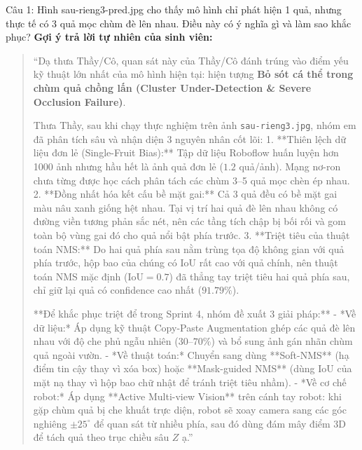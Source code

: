 \documentclass[11pt,a4paper]{article}
\begin{document}
\begin{ansbox}{Câu 1: Hình sau-rieng3-pred.jpg cho thấy mô hình chỉ phát hiện 1 quả, nhưng thực tế có 3 quả mọc chùm đè lên nhau. Điều này có ý nghĩa gì và làm sao khắc phục?}
\textbf{Gợi ý trả lời tự nhiên của sinh viên:}
\begin{quote}
``Dạ thưa Thầy/Cô, quan sát này của Thầy/Cô đánh trúng vào điểm yếu kỹ thuật lớn nhất của mô hình hiện tại: hiện tượng \textbf{Bỏ sót cá thể trong chùm quả chồng lấn (Cluster Under-Detection \& Severe Occlusion Failure)}.

Thưa Thầy, sau khi chạy thực nghiệm trên ảnh \texttt{sau-rieng3.jpg}, nhóm em đã phân tích sâu và nhận diện 3 nguyên nhân cốt lõi:
1. **Thiên lệch dữ liệu đơn lẻ (Single-Fruit Bias):** Tập dữ liệu Roboflow huấn luyện hơn 1000 ảnh nhưng hầu hết là ảnh quả đơn lẻ ($1.2$ quả/ảnh). Mạng nơ-ron chưa từng được học cách phân tách các chùm 3--5 quả mọc chèn ép nhau.
2. **Đồng nhất hóa kết cấu bề mặt gai:** Cả 3 quả đều có bề mặt gai màu nâu xanh giống hệt nhau. Tại vị trí hai quả đè lên nhau không có đường viền tương phản sắc nét, nên các tầng tích chập bị bối rối và gom toàn bộ vùng gai đó cho quả nổi bật phía trước.
3. **Triệt tiêu của thuật toán NMS:** Do hai quả phía sau nằm trùng tọa độ không gian với quả phía trước, hộp bao của chúng có IoU rất cao với quả chính, nên thuật toán NMS mặc định ($\text{IoU}=0.7$) đã thẳng tay triệt tiêu hai quả phía sau, chỉ giữ lại quả có confidence cao nhất ($91.79\%$).

**Để khắc phục triệt để trong Sprint 4, nhóm đề xuất 3 giải pháp:**
- *Về dữ liệu:* Áp dụng kỹ thuật Copy-Paste Augmentation ghép các quả đè lên nhau với độ che phủ ngẫu nhiên ($30\text{--}70\%$) và bổ sung ảnh gán nhãn chùm quả ngoài vườn.
- *Về thuật toán:* Chuyển sang dùng **Soft-NMS** (hạ điểm tin cậy thay vì xóa box) hoặc **Mask-guided NMS** (dùng IoU của mặt nạ thay vì hộp bao chữ nhật để tránh triệt tiêu nhầm).
- *Về cơ chế robot:* Áp dụng **Active Multi-view Vision** trên cánh tay robot: khi gặp chùm quả bị che khuất trực diện, robot sẽ xoay camera sang các góc nghiêng $\pm 25^\circ$ để quan sát từ nhiều phía, sau đó dùng đám mây điểm 3D để tách quả theo trục chiều sâu $Z$ ạ.''
\end{quote}
\end{ansbox}

\vspace{6pt}
\end{document}
